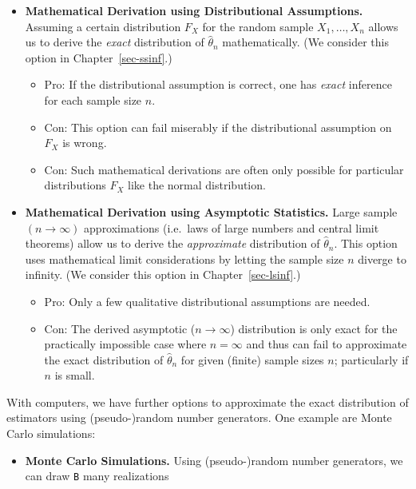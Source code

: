 \documentclass[
  letterpaper,
  DIV=11,
  numbers=noendperiod]{scrreprt}
\providecommand{\tightlist}{%
  \setlength{\itemsep}{0pt}\setlength{\parskip}{0pt}}\usepackage{longtable,booktabs,array}
\theoremstyle{definition}
\theoremstyle{plain}
\theoremstyle{plain}
\theoremstyle{remark}
\begin{document}
\begin{itemize}
\tightlist
\item
  \textbf{Mathematical Derivation using Distributional Assumptions.}
  Assuming a certain distribution \(F_X\) for the random sample
  \(X_1,\dots,X_n\) allows us to derive the \emph{exact} distribution of
  \(\hat\theta_n\) mathematically. (We consider this option in
  Chapter~\ref{sec-ssinf}.)

  \begin{itemize}
  \tightlist
  \item
    Pro: If the distributional assumption is correct, one has
    \emph{exact} inference for each sample size \(n\).
  \item
    Con: This option can fail miserably if the distributional assumption
    on \(F_X\) is wrong.
  \item
    Con: Such mathematical derivations are often only possible for
    particular distributions \(F_X\) like the normal distribution.
  \end{itemize}
\item
  \textbf{Mathematical Derivation using Asymptotic Statistics.} Large
  sample \((n\to\infty)\) approximations (i.e.~laws of large numbers and
  central limit theorems) allow us to derive the \emph{approximate}
  distribution of \(\hat\theta_n\). This option uses mathematical limit
  considerations by letting the sample size \(n\) diverge to infinity.
  (We consider this option in Chapter~\ref{sec-lsinf}.)

  \begin{itemize}
  \tightlist
  \item
    Pro: Only a few qualitative distributional assumptions are needed.
  \item
    Con: The derived asymptotic (\(n\to\infty\)) distribution is only
    exact for the practically impossible case where \(n=\infty\) and
    thus can fail to approximate the exact distribution of
    \(\hat\theta_n\) for given (finite) sample sizes \(n\); particularly
    if \(n\) is small.
  \end{itemize}
\end{itemize}

With computers, we have further options to approximate the exact
distribution of estimators using (pseudo-)random number generators. One
example are Monte Carlo simulations:

\begin{itemize}
\tightlist
\item
  \textbf{Monte Carlo Simulations.} Using (pseudo-)random number
  generators, we can draw \texttt{B} many realizations
\end{itemize}
\end{document}
